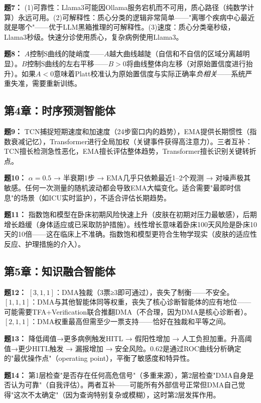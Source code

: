 \documentclass[11pt,a4paper]{ctexart}
\begin{document}
\textbf{题7：} (1)可靠性：Llama3可能因Ollama服务宕机而不可用，质心路径（纯数学计算）永远可用。(2)可解释性：质心分类的逻辑非常简单——"离哪个疾病中心最近就是哪个"——优于LLM黑箱推理的可解释性。(3)速度：质心分类毫秒级，Llama3秒级。快速分诊使用质心，复杂病例使用Llama3。

\textbf{题8：} $A$控制S曲线的陡峭度——$A$越大曲线越陡（自信和不自信的区域分离越明显）。$B$控制S曲线的左右平移——$B>0$将曲线整体向左移（对原始置信度进行抬升）。如果$A<0$意味着Platt校准认为原始置信度与实际正确率\emph{负相关}——系统严重失准，需要重新训练。

\subsection*{第4章：时序预测智能体}

\textbf{题9：} TCN捕捉短期速度和加速度（24步窗口内的趋势），EMA提供长期惯性（指数衰减记忆），Transformer进行全局加权（关键事件获得高注意力）。三者互补：TCN擅长检测急性恶化，EMA擅长评估整体趋势，Transformer擅长识别关键转折点。

\textbf{题10：} $\alpha=0.5$ → 半衰期1步 → EMA几乎只依赖最近1--2个观测 → 对噪声极其敏感。任何一次测量的随机波动都会导致EMA大幅变化。适合需要"最即时信息"的场景（如ICU实时监护），不适合评估长期趋势。

\textbf{题11：} 指数饱和模型在卧床初期风险快速上升（皮肤在初期对压力最敏感），后期增长趋缓（身体适应或已采取防护措施）。线性增长意味着卧床100天风险是卧床10天的10倍——这在临床上不准确。指数饱和模型更符合生物学现实（皮肤的适应性反应、护理措施的介入）。

\subsection*{第5章：知识融合智能体}

\textbf{题12：} $[3,1,1]$：DMA独裁（3票≥3即可通过），丧失了制衡——不安全。$[1,1,1]$：DMA与其他智能体同等权重，丧失了核心诊断智能体的应有地位——可能需要TFA+Verification联合推翻DMA（不合理，因为DMA是核心诊断者）。$[2,1,1]$：DMA权重最高但需至少一票支持——恰好在独裁和平等之间。

\textbf{题13：} 降低阈值→更多病例触发HITL → 假阳性增加 → 人工负担加重。升高阈值→更少HITL触发 → 漏报增加 → 安全风险。0.62是通过ROC曲线分析确定的"最优操作点"（operating point），平衡了敏感度和特异性。

\textbf{题14：} 第1层检查"是否存在任何高危信号"（多重来源），第2层检查"DMA自身是否认为可靠"（自我评估）。两者互补——可能所有外部信号正常但DMA自己觉得"这次不太确定"（因为查询特别复杂或模糊），这时第2层发挥作用。
\end{document}
